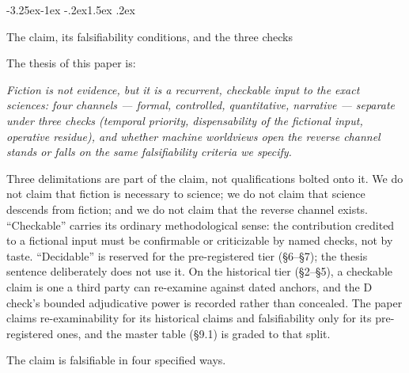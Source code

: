 \documentclass[11pt,a4paper]{article}
\makeatletter
\renewcommand\subsection{\@startsection{subsection}{2}{\z@}%
  {-3.25ex\@plus -1ex \@minus -.2ex}{1.5ex \@plus .2ex}%
  {\normalfont\large\bfseries\raggedright}}
\makeatother
\begin{document}
\subsection{The claim, its falsifiability conditions, and the three checks}

The thesis of this paper is:

\textit{Fiction is not evidence, but it is a recurrent, checkable input to the exact sciences: four channels — formal, controlled, quantitative, narrative — separate under three checks (temporal priority, dispensability of the fictional input, operative residue), and whether machine worldviews open the reverse channel stands or falls on the same falsifiability criteria we specify.}

Three delimitations are part of the claim, not qualifications bolted onto it. We do not claim that fiction is necessary to science; we do not claim that science descends from fiction; and we do not claim that the reverse channel exists. ``Checkable'' carries its ordinary methodological sense: the contribution credited to a fictional input must be confirmable or criticizable by named checks, not by taste. ``Decidable'' is reserved for the pre-registered tier (§6–§7); the thesis sentence deliberately does not use it. On the historical tier (§2–§5), a checkable claim is one a third party can re-examine against dated anchors, and the D check's bounded adjudicative power is recorded rather than concealed. The paper claims re-examinability for its historical claims and falsifiability only for its pre-registered ones, and the master table (§9.1) is graded to that split.

The claim is falsifiable in four specified ways.
\end{document}
